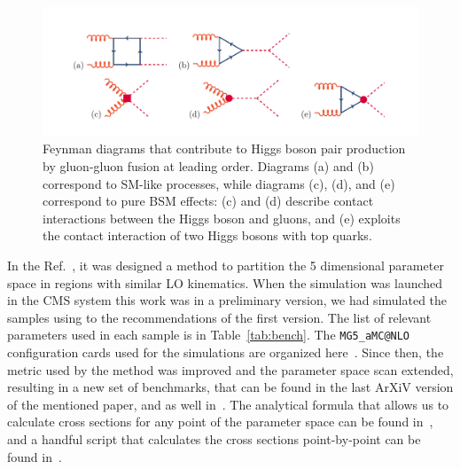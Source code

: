 \begin{figure}[h]
\centering
\includegraphics[scale=0.85]{figures/translation.pdf}
\caption{\small Feynman diagrams that contribute to Higgs boson pair production by gluon-gluon fusion at leading order. Diagrams (a) and (b) correspond to SM-like processes, while diagrams (c), (d), and (e) correspond to pure BSM effects: (c) and (d) describe contact interactions between the Higgs boson and gluons, and (e) exploits the contact interaction of two Higgs bosons with top quarks.   \label{fig:dia}}
\end{figure} 

In the Ref.~\cite{Dall'Osso:2015aia}, it was designed a method to partition the 5 dimensional parameter space in regions 
with similar LO kinematics. 
When the simulation was launched in the CMS system this work was in a preliminary version, we had simulated the samples 
using to the recommendations of the first version. The list of relevant parameters used in each sample is in Table~\ref{tab:bench}. 
 The {\tt MG5\_aMC@NLO} configuration cards used for the simulations are organized here~\cite{cards}. 
Since then, the metric used by the method was improved and the parameter space scan extended, resulting in a 
new set of benchmarks, that can be found in the last ArXiV version of the mentioned paper, and as well in~\cite{MelladoGarcia:2150771}.
The analytical formula that allows us to calculate cross sections for any point of the parameter space can be found in~\cite{CarvalhoAntunesDeOliveira:2130724}, and a handful script that calculates the cross sections point-by-point can be found in~\cite{hhrosetta}.  

